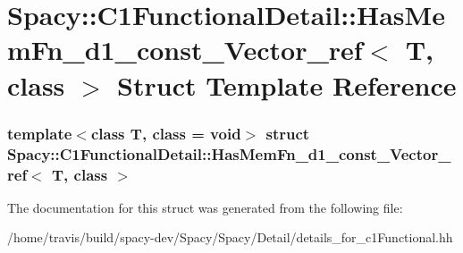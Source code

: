 \hypertarget{structSpacy_1_1C1FunctionalDetail_1_1HasMemFn__d1__const__Vector__ref}{\section{\-Spacy\-:\-:\-C1\-Functional\-Detail\-:\-:\-Has\-Mem\-Fn\-\_\-d1\-\_\-const\-\_\-\-Vector\-\_\-ref$<$ \-T, class $>$ \-Struct \-Template \-Reference}
\label{structSpacy_1_1C1FunctionalDetail_1_1HasMemFn__d1__const__Vector__ref}
}
\subsubsection*{template$<$class T, class = void$>$ struct Spacy\-::\-C1\-Functional\-Detail\-::\-Has\-Mem\-Fn\-\_\-d1\-\_\-const\-\_\-\-Vector\-\_\-ref$<$ T, class $>$}



\-The documentation for this struct was generated from the following file\-:\begin{DoxyCompactItemize}
\item 
/home/travis/build/spacy-\/dev/\-Spacy/\-Spacy/\-Detail/details\-\_\-for\-\_\-c1\-Functional.\-hh\end{DoxyCompactItemize}

